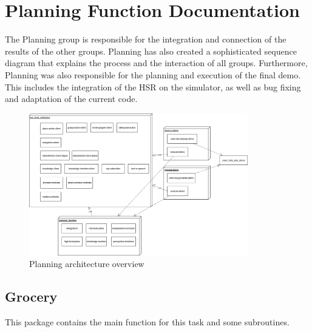 \documentclass[main.tex]{subfiles}
\begin{document}
	\begingroup

	\renewcommand{\cleardoublepage}{}

	\renewcommand{\clearpage}{}
	
	\newpage

	\chapter{Planning Function Documentation}

		
		The Planning group is responsible for the integration and connection of the results of the other groups. Planning has also created a sophisticated sequence diagram that explains the process and the interaction of all groups.
	    Furthermore, Planning was also responsible for the planning and execution of the final demo. This includes the integration of the HSR on the simulator, as well as bug fixing and adaptation of the current code.

		\begin{figure}[h]
			\centering
			\includegraphics[width=0.85\textwidth]{pictures/diagramms/planning.png}
			\caption{Planning architecture overview}
			\label{planning-overview}
		\end{figure}
		
		\section{Grocery}
		\label{grocery}
		This package contains the main function for this task and some subroutines.
\end{document}
